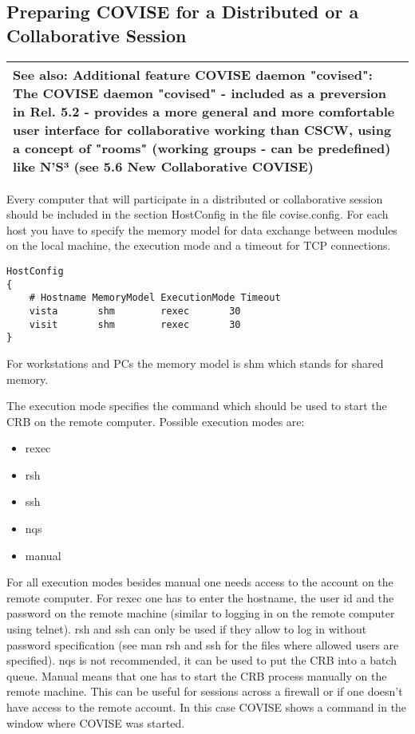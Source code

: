%
\clearpage

\subsection{Preparing COVISE for a Distributed or a Collaborative Session}

\begin{longtable}{|p{14cm}|}
\hline
\newline
{\bf See also: Additional feature COVISE daemon "covised":}\newline
The COVISE daemon "covised" - included as a {\bf preversion} in Rel. 5.2 - 
provides a more general and more comfortable user interface for collaborative 
working than CSCW, using a concept of "rooms" (working groups - can be {\bf predefined}) 
like N'S³ (see {\bf 5.6 New Collaborative COVISE})\newline 
\\									
\hline
\end{longtable}

Every computer that will participate in a distributed or collaborative session should be included in the section
HostConfig in the file covise.config. For each host you have to specify the memory model for data exchange between
modules on the local machine, the execution mode and a timeout for TCP connections. 

\begin{verbatim}
HostConfig
{
    # Hostname MemoryModel ExecutionMode Timeout
    vista       shm        rexec       30
    visit       shm        rexec       30
}
\end{verbatim}

For workstations and PCs the memory model is shm which stands for shared memory.

The execution mode specifies the command which should be used to start the CRB on the remote computer. Possible
execution modes are:

\begin{itemize}
\item rexec
\item rsh
\item ssh
\item nqs
\item manual
\end{itemize}

For all execution modes besides manual one needs access to the account on the remote 
computer. For rexec one has to enter the hostname, the user id and the password on the 
remote machine (similar to logging in on the remote computer using telnet). rsh and ssh 
can only be used if they allow to log in without password specification (see man rsh and 
ssh for the files where allowed users are specified). nqs is not recommended, it can be 
used to put the CRB into a batch queue. Manual means that one has to start the CRB 
process manually on the remote machine. This can be useful for sessions across a 
firewall or if one doesn't have access to the remote account. In this case COVISE 
shows a command in the window where COVISE was started.

